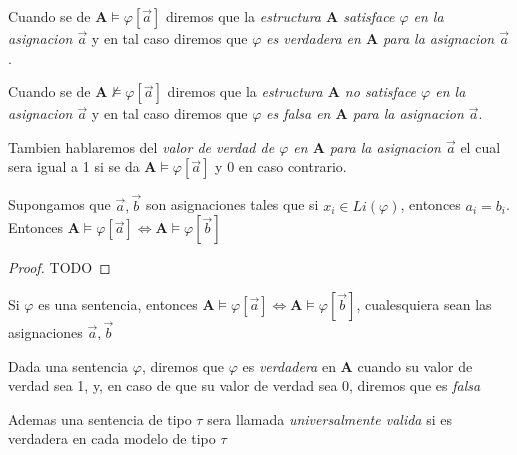 \begin{definition}
  Cuando se de $\mathbf{A}\models\varphi[\vec{a}]$ diremos que la \emph{estructura $\mathbf{A}$ satisface $\varphi$ en la asignacion $\vec{a}$} y en tal caso
  diremos que $\varphi$ \emph{es verdadera en $\mathbf{A}$ para la asignacion $\vec{a}$}.

  Cuando se de $\mathbf{A}\not\models\varphi[\vec{a}]$ diremos que la \emph{estructura $\mathbf{A}$ no satisface $\varphi$ en la asignacion $\vec{a}$} y en tal caso
  diremos que $\varphi$ \emph{es falsa en $\mathbf{A}$ para la asignacion $\vec{a}$}.

  Tambien hablaremos del \emph{valor de verdad de $\varphi$ en $\mathbf{A}$ para la asignacion $\vec{a}$} el cual sera 
  igual a 1 si se da $\mathbf{A}\models\varphi[\vec{a}]$ y 0 en caso contrario.
\end{definition}

\begin{lemma}
  Supongamos que $\vec{a}, \vec{b}$ son asignaciones tales que si $x_i \in Li(\varphi)$, entonces $a_i = b_i$. Entonces
  $\mathbf{A}\models\varphi[\vec{a}] \iff \mathbf{A}\models\varphi[\vec{b}]$
\end{lemma}
\begin{proof}
  TODO
\end{proof}
\begin{corollary}
  Si $\varphi$ es una sentencia, entonces $\mathbf{A}\models\varphi[\vec{a}] \iff \mathbf{A}\models\varphi[\vec{b}]$, cualesquiera sean 
  las asignaciones $\vec{a}, \vec{b}$
\end{corollary}

\begin{definition}
  Dada una sentencia $\varphi$, diremos que $\varphi$ es \emph{verdadera} en $\mathbf{A}$ cuando su valor de verdad sea 1, y, en caso de que 
  su valor de verdad sea 0, diremos que es \emph{falsa}

  Ademas una sentencia de tipo $\tau$ sera llamada \emph{universalmente valida} si es verdadera en cada modelo de tipo $\tau$
\end{definition}

